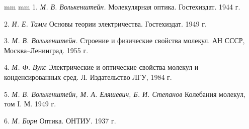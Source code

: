 mm
 mm
1. {\itshape М. В. Волькенштейн.} Молекулярная оптика. Гостехиздат. 1944 г.

2. {\itshape И. Е. Тамм} Основы теории электричества. Гостехиздат. 1949 г.

3. {\itshape М. В. Волькенштейн.} Строение и физические свойства молекул. АН СССР, Москва--Ленинград. 1955 г.

4. {\itshape М. Ф. Вукс}
Электрические и оптические свойства молекул и конденсированных сред. Л. Издательство ЛГУ, 1984 г.

5. {\itshape М. В. Волькенштейн, М. А. Еляшевич, Б. И. Степанов}
Колебания молекул, том I. М. 1949 г.

6. {\itshape М. Борн}
Оптика. ОНТИУ. 1937 г.
